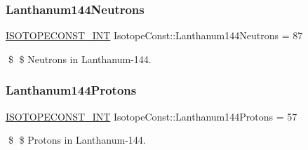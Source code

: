 \subsubsection{\texorpdfstring{Lanthanum144\+Neutrons}{Lanthanum144Neutrons}}
{\footnotesize\ttfamily \mbox{\hyperlink{group___isotope_const-_macros_ga5f18360b3e99483a35c32d789e62621c}{I\+S\+O\+T\+O\+P\+E\+C\+O\+N\+S\+T\+\_\+\+I\+NT}} Isotope\+Const\+::\+Lanthanum144\+Neutrons = 87}

\$ \$ Neutrons in Lanthanum-\/144. \mbox{\label{group___isotope_const-_lanthanum-_la144_ga390d814c3240e25b2fa0ee1e0c531399}} 
\subsubsection{\texorpdfstring{Lanthanum144\+Protons}{Lanthanum144Protons}}
{\footnotesize\ttfamily \mbox{\hyperlink{group___isotope_const-_macros_ga5f18360b3e99483a35c32d789e62621c}{I\+S\+O\+T\+O\+P\+E\+C\+O\+N\+S\+T\+\_\+\+I\+NT}} Isotope\+Const\+::\+Lanthanum144\+Protons = 57}

\$ \$ Protons in Lanthanum-\/144. 